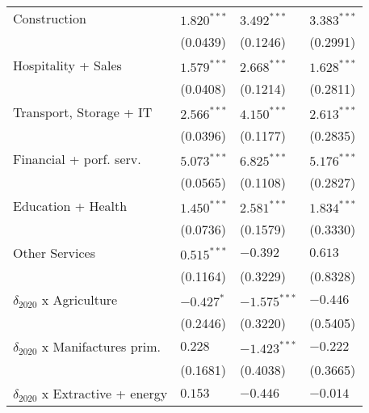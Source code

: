 \begin{tabular}{llll}
Construction                                       &      $1.820^{***}$ &      $3.492^{***}$ &      $3.383^{***}$ \\
                                                   &           (0.0439) &           (0.1246) &           (0.2991) \\
Hospitality + Sales                                &      $1.579^{***}$ &      $2.668^{***}$ &      $1.628^{***}$ \\
                                                   &           (0.0408) &           (0.1214) &           (0.2811) \\
Transport, Storage + IT                            &      $2.566^{***}$ &      $4.150^{***}$ &      $2.613^{***}$ \\
                                                   &           (0.0396) &           (0.1177) &           (0.2835) \\
Financial + porf. serv.                            &      $5.073^{***}$ &      $6.825^{***}$ &      $5.176^{***}$ \\
                                                   &           (0.0565) &           (0.1108) &           (0.2827) \\
Education + Health                                 &      $1.450^{***}$ &      $2.581^{***}$ &      $1.834^{***}$ \\
                                                   &           (0.0736) &           (0.1579) &           (0.3330) \\
Other Services                                     &      $0.515^{***}$ &           $-0.392$ &            $0.613$ \\
                                                   &           (0.1164) &           (0.3229) &           (0.8328) \\
$\delta_{2020}$ x Agriculture                      &         $-0.427^*$ &     $-1.575^{***}$ &           $-0.446$ \\
                                                   &           (0.2446) &           (0.3220) &           (0.5405) \\
$\delta_{2020}$ x Manifactures prim.               &            $0.228$ &     $-1.423^{***}$ &           $-0.222$ \\
                                                   &           (0.1681) &           (0.4038) &           (0.3665) \\
$\delta_{2020}$ x Extractive + energy              &            $0.153$ &           $-0.446$ &           $-0.014$ \\

\end{tabular}

